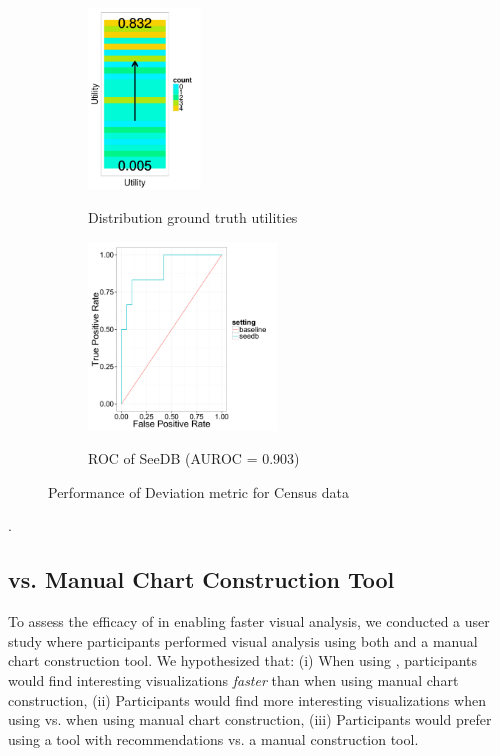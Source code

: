\begin{figure}[t]
	\centering
	\begin{subfigure}{0.3\linewidth}
		{\includegraphics[trim={0 1.3cm 0 0}, clip, width=3cm]{Images/census_gt_distribution.pdf}}
		\caption{Distribution ground truth utilities}
		\label{fig:gt_dist}
	\end{subfigure}
	\begin{subfigure}{0.68\linewidth}
		\centering 
		{\includegraphics[width=5cm] {Images/seedb_roc.pdf}} 
		\caption{ROC of SeeDB (AUROC = 0.903)}
		\label{fig:roc}
	\end{subfigure}
	\vspace{-10pt}
	\caption{Performance of Deviation metric for Census data}
	\vspace{-10pt}
	\label{fig:census_gt}
\end{figure}

.

\subsection{\SeeDB vs. Manual Chart Construction Tool}
\label{sec:seedb_vs_manual}

To assess the efficacy of \SeeDB in enabling faster visual analysis,
we conducted a user study where participants performed visual analysis
using both \SeeDB and a manual chart construction tool.
We hypothesized that: (i) When using \SeeDB, participants would find 
interesting visualizations {\em faster} than when using manual chart
construction, (ii) Participants would find more interesting visualizations
when using \SeeDB vs. when using manual chart construction, (iii) 
Participants would prefer using a tool with recommendations vs. a manual
construction tool.

